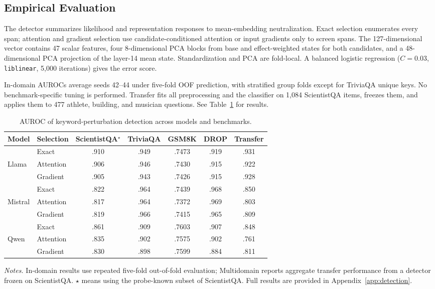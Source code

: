 \subsection{Empirical Evaluation}
The detector summarizes likelihood and representation responses to mean-embedding
neutralization. Exact selection enumerates every span; attention and gradient
selection use candidate-conditioned attention or input gradients only to screen
spans. The 127-dimensional vector contains 47 scalar features, four 8-dimensional
PCA blocks from base and effect-weighted states for both candidates, and a
48-dimensional PCA projection of the layer-14 mean state. Standardization and
PCA are fold-local. A balanced logistic regression ($C=0.03$, \texttt{liblinear},
5,000 iterations) gives the error score.

In-domain AUROCs average seeds 42--44 under five-fold OOF prediction, with
stratified group folds except for TriviaQA unique keys. No benchmark-specific
tuning is performed. Transfer fits all preprocessing and the classifier on
1,084 ScientistQA items, freezes them, and applies them to 477 athlete, building,
and musician questions. See Table~\ref{tab:perturbation-detection-summary} for results.

\begin{table}[t]
\centering
\caption{AUROC of keyword-perturbation detection across models and benchmarks.}
\label{tab:perturbation-detection-summary}
\small
\setlength{\tabcolsep}{6pt}
\begin{tabular}{llccccc}
\toprule
Model & Selection & ScientistQA$^\star$ & TriviaQA & GSM8K & DROP & Transfer \\
\midrule
 & Exact     & .910 & .949 & .7473 & .919 & .931 \\
Llama & Attention & .906 & .946 & .7430 & .915 & .922 \\
 & Gradient  & .905 & .943 & .7426 & .915 & .928 \\
\midrule
 & Exact     & .822 & .964 & .7439 & .968 & .850 \\
Mistral & Attention & .817 & .964 & .7372 & .969 & .803 \\
 & Gradient  & .819 & .966 & .7415 & .965 & .809 \\
\midrule
 & Exact     & .861 & .909 & .7603 & .907 & .848 \\
Qwen & Attention & .835 & .902 & .7575 & .902 & .761 \\
 & Gradient  & .830 & .898 & .7599 & .884 & .811 \\
\bottomrule
\end{tabular}

\vspace{2pt}
\begin{minipage}{0.92\linewidth}
\footnotesize
\textit{Notes.}
In-domain results use repeated five-fold out-of-fold evaluation; Multidomain reports aggregate transfer performance from a detector frozen on ScientistQA.  
$\star$ means using the probe-known subset of ScientistQA. Full results are provided in Appendix~\ref{app:detection}.
\end{minipage}
\end{table}

